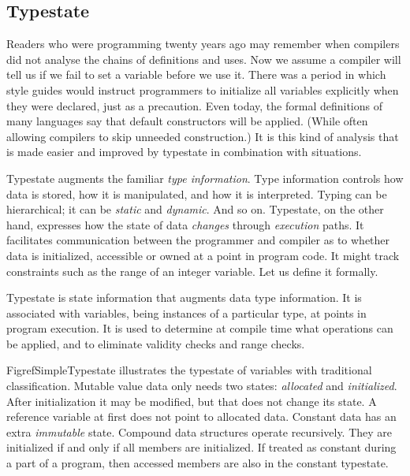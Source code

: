 \documentclass[10pt]{amsart}
\begin{document}
\subsection{Typestate}


Readers who were programming twenty years ago may remember when
compilers did not analyse the chains of definitions and uses.  Now we
assume a compiler will tell us if we fail to set a variable before we
use it.  There was a period in which style guides would instruct
programmers to initialize all variables explicitly when they were
declared, just as a precaution.  Even today, the formal definitions of
many languages say that default constructors will be applied.  (While
often allowing compilers to skip unneeded construction.)  It is this
kind of analysis that is made easier and improved by typestate in
combination with situations.

Typestate augments the familiar \emph{type information}.  Type
information controls how data is stored, how it is manipulated, and
how it is interpreted.  Typing can be hierarchical; it can be
\emph{static} and \emph{dynamic}.  And so on.  Typestate, on the other
hand, expresses how the state of data \emph{changes} through
\emph{execution} paths.  It facilitates communication between the
programmer and compiler as to whether data is initialized, accessible
or owned at a point in program code.  It might track constraints such
as the range of an integer variable.  Let us define it formally.
\begin{defn}[Typestate]
  Typestate is state information that augments data type information.
  It is associated with variables, being instances of a particular
  type, at points in program execution.  It is used to determine at
  compile time what operations can be applied, and to eliminate
  validity checks and range checks.
\end{defn}

Figref{SimpleTypestate} illustrates the typestate of variables with
traditional classification.  Mutable value data only needs two states:
\emph{allocated} and \emph{initialized}.  After initialization it may
be modified, but that does not change its state.  A reference variable
at first does not point to allocated data.  Constant data has an extra
\emph{immutable} state.  Compound data structures operate recursively.
They are initialized if and only if all members are initialized.  If
treated as constant during a part of a program, then accessed members
are also in the constant typestate.
\end{document}
